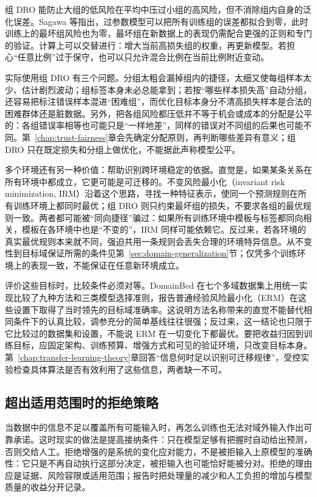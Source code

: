 组 DRO 能防止大组的低风险在平均中压过小组的高风险，但不消除组内自身的泛化误差。Sagawa 等指出，过参数模型可以把所有训练组的误差都拟合到零，此时训练上的最坏组风险也为零，最坏组在新数据上的表现仍需配合更强的正则和专门的验证。计算上可以交替进行：增大当前高损失组的权重，再更新模型。若担心“任意比例”过于保守，也可以只允许混合比例在当前比例附近变动。

实际使用组 DRO 有三个问题。分组太粗会漏掉组内的捷径，太细又使每组样本太少、估计剧烈波动；组标签本身未必总能拿到；若按“哪些样本损失高”自动分组，还容易把标注错误样本混进“困难组”，而优化目标本身分不清高损失样本是合法的困难群体还是脏数据。另外，把各组风险都压低并不等于机会或成本的分配是公平的：各组错误率相等也可能只是“一样地差”，同样的错误对不同组的后果也可能不同。第~\ref{chap:trust-fairness}章会先确定分配原则，再判断哪些差异有意义；组 DRO 只在既定损失和分组上做优化，不能据此声称模型公平。

多个环境还有另一种价值：帮助识别跨环境稳定的依据。直觉是，如果某条关系在所有环境中都成立，它更可能是可迁移的。不变风险最小化（invariant risk minimization, IRM）沿着这个思路，寻找一种特征表示，使同一个预测规则在所有训练环境上都同时最优；组 DRO 则只约束最坏组的损失，不要求各组的最优规则一致。两者都可能被“同向捷径”骗过：如果所有训练环境中模板与标签都同向相关，模板在各环境中也是“不变的”，IRM 同样可能依赖它。反过来，若各环境的真实最优规则本来就不同，强迫共用一条规则会丢失合理的环境特异信息。从不变性到目标域保证所需的条件见第~\ref{sec:domain-generalization}节；仅凭多个训练环境上的表现一致，不能保证在任意新环境成立。

评价这些目标时，比较条件必须对等。DomainBed 在七个多域数据集上用统一实现比较了九种方法和三类模型选择准则，报告普通经验风险最小化（ERM）在这些设置下取得了当时领先的目标域准确率。这说明方法名称带来的直觉不能替代相同条件下的认真比较，调参充分的简单基线往往很强；反过来，这一结论也只限于它比较过的数据集和设置，不能说 ERM 在一切变化下都最优。要把收益归因到训练目标，应固定架构、训练预算、增强方式和可见的验证环境，只改变目标本身。第~\ref{chap:transfer-learning-theory}章回答“信息何时足以识别可迁移规律”，受控实验检查具体算法是否有效利用了这些信息，两者缺一不可。

\subsection{超出适用范围时的拒绝策略}
\label{sec:robustness-rejection}

当数据中的信息不足以覆盖所有可能输入时，再怎么训练也无法对域外输入作出可靠承诺。这时现实的做法是提高接纳条件：只在模型足够有把握时自动给出预测，否则交给人工。拒绝增强的是系统的变化应对能力，不是被拒输入上原模型的准确性：它只是不再自动执行这部分决定，被拒输入也可能恰好能被分对。拒绝的理由应是证据、风险容限或适用范围；报告时把处理量的减少和人工负担的增加与模型质量的收益分开记录。

